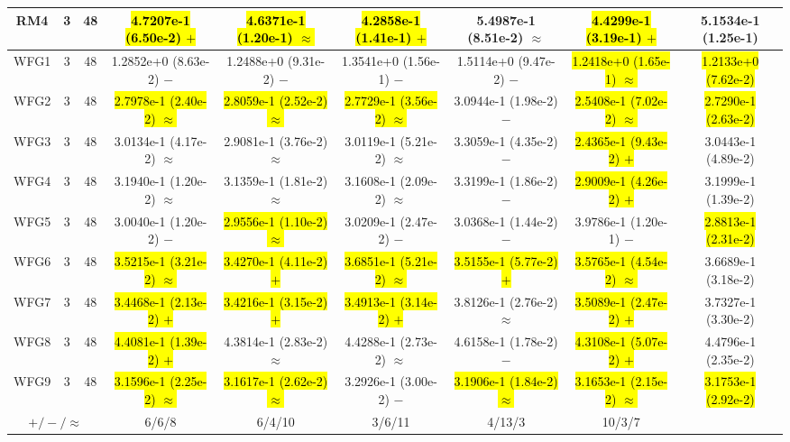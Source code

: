 \documentclass[journal]{IEEEtran}
\begin{document}
\begin{table*}[htbp]
\begin{tabular}{ccccccccc}
\hline
\multirow{1}{*}{RM4}&3&48&\hl{4.7207e-1 (6.50e-2) $+$}&\hl{4.6371e-1 (1.20e-1) $\approx$}&\hl{4.2858e-1 (1.41e-1) $+$}&5.4987e-1 (8.51e-2) $\approx$&\hl{4.4299e-1 (3.19e-1) $+$}&5.1534e-1 (1.25e-1)\\
\hline
\multirow{1}{*}{WFG1}&3&48&1.2852e+0 (8.63e-2) $-$&1.2488e+0 (9.31e-2) $-$&1.3541e+0 (1.56e-1) $-$&1.5114e+0 (9.47e-2) $-$&\hl{1.2418e+0 (1.65e-1) $\approx$}&\hl{1.2133e+0 (7.62e-2)}\\
\hline
\multirow{1}{*}{WFG2}&3&48&\hl{2.7978e-1 (2.40e-2) $\approx$}&\hl{2.8059e-1 (2.52e-2) $\approx$}&\hl{2.7729e-1 (3.56e-2) $\approx$}&3.0944e-1 (1.98e-2) $-$&\hl{2.5408e-1 (7.02e-2) $\approx$}&\hl{2.7290e-1 (2.63e-2)}\\
\hline
\multirow{1}{*}{WFG3}&3&48&3.0134e-1 (4.17e-2) $\approx$&2.9081e-1 (3.76e-2) $\approx$&3.0119e-1 (5.21e-2) $\approx$&3.3059e-1 (4.35e-2) $-$&\hl{2.4365e-1 (9.43e-2) $+$}&3.0443e-1 (4.89e-2)\\
\hline
\multirow{1}{*}{WFG4}&3&48&3.1940e-1 (1.20e-2) $\approx$&3.1359e-1 (1.81e-2) $\approx$&3.1608e-1 (2.09e-2) $\approx$&3.3199e-1 (1.86e-2) $-$&\hl{2.9009e-1 (4.26e-2) $+$}&3.1999e-1 (1.39e-2)\\
\hline
\multirow{1}{*}{WFG5}&3&48&3.0040e-1 (1.20e-2) $-$&\hl{2.9556e-1 (1.10e-2) $\approx$}&3.0209e-1 (2.47e-2) $-$&3.0368e-1 (1.44e-2) $-$&3.9786e-1 (1.20e-1) $-$&\hl{2.8813e-1 (2.31e-2)}\\
\hline
\multirow{1}{*}{WFG6}&3&48&\hl{3.5215e-1 (3.21e-2) $\approx$}&\hl{3.4270e-1 (4.11e-2) $+$}&\hl{3.6851e-1 (5.21e-2) $\approx$}&\hl{3.5155e-1 (5.77e-2) $+$}&\hl{3.5765e-1 (4.54e-2) $\approx$}&3.6689e-1 (3.18e-2)\\
\hline
\multirow{1}{*}{WFG7}&3&48&\hl{3.4468e-1 (2.13e-2) $+$}&\hl{3.4216e-1 (3.15e-2) $+$}&\hl{3.4913e-1 (3.14e-2) $+$}&3.8126e-1 (2.76e-2) $\approx$&\hl{3.5089e-1 (2.47e-2) $+$}&3.7327e-1 (3.30e-2)\\
\hline
\multirow{1}{*}{WFG8}&3&48&\hl{4.4081e-1 (1.39e-2) $+$}&4.3814e-1 (2.83e-2) $\approx$&4.4288e-1 (2.73e-2) $\approx$&4.6158e-1 (1.78e-2) $-$&\hl{4.3108e-1 (5.07e-2) $+$}&4.4796e-1 (2.35e-2)\\
\hline
\multirow{1}{*}{WFG9}&3&48&\hl{3.1596e-1 (2.25e-2) $\approx$}&\hl{3.1617e-1 (2.62e-2) $\approx$}&3.2926e-1 (3.00e-2) $-$&\hl{3.1906e-1 (1.84e-2) $\approx$}&\hl{3.1653e-1 (2.15e-2) $\approx$}&\hl{3.1753e-1 (2.92e-2)}\\
\hline
\multicolumn{3}{c}{$+/-/\approx$}&6/6/8&6/4/10&3/6/11&4/13/3&10/3/7&\\
\bottomrule
\end{tabular}
\label{No Label}
\end{table*}
\end{document}
